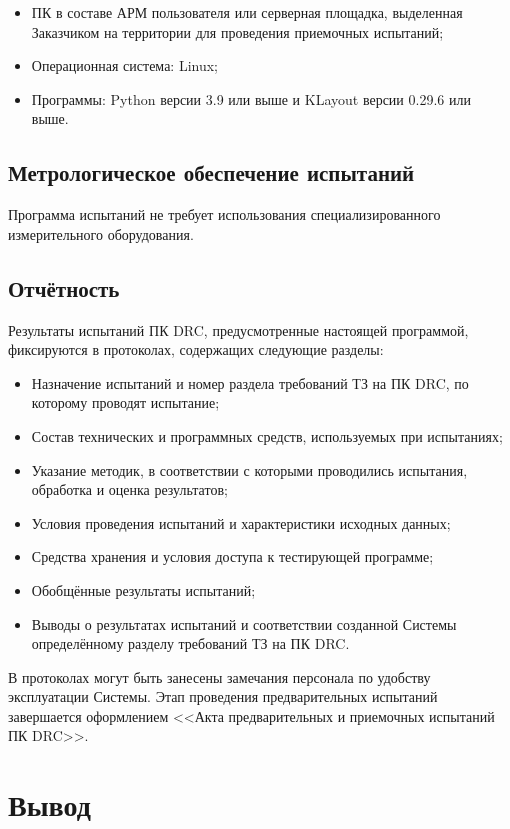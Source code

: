 \begin{itemize}
	\item ПК в составе АРМ пользователя
		или серверная площадка, выделенная Заказчиком на территории
		для проведения приемочных испытаний;
	\item Операционная система: Linux;
	\item Программы: Python версии 3.9 или выше
		и KLayout версии 0.29.6 или выше.
\end{itemize}

\subsection{Метрологическое обеспечение испытаний}

Программа испытаний не требует
использования специализированного измерительного оборудования.

\subsection{Отчётность}

Результаты испытаний ПК DRC, предусмотренные настоящей программой,
фиксируются в протоколах, содержащих следующие разделы:

\begin{itemize}
	\item Назначение испытаний и номер раздела требований ТЗ на ПК DRC,
		по которому проводят испытание;
	\item Состав технических и программных средств,
		используемых при испытаниях;
	\item Указание методик, в соответствии с которыми проводились испытания,
		обработка и оценка результатов;
	\item Условия проведения испытаний и характеристики исходных данных;
	\item Средства хранения и условия доступа к тестирующей программе;
	\item Обобщённые результаты испытаний;
	\item Выводы о результатах испытаний
		и соответствии созданной Системы
		определённому разделу требований ТЗ на ПК DRC.
\end{itemize}

В протоколах могут быть занесены замечания персонала
по удобству эксплуатации Системы.
Этап проведения предварительных испытаний завершается
оформлением <<Акта предварительных и приемочных испытаний ПК DRC>>.

\clearpage

\section*{\LARGE Вывод}

